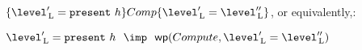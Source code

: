 %
%
%
%
%
%
%
%
%
%
%
%
%
%
%
$\assert{ \level'\L = \present~h } {Comp} \assert{\level'\L = \level''\L}$, or equivalently,:

$\level'\L = \present~h ~~\imp~~\wp{Compute}{\level'\L = \level''\L}$

